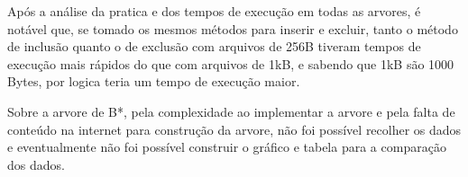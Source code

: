 \label{Conclusão}


Após a análise  da pratica e dos tempos de execução em todas as arvores, é notável que, se tomado os mesmos métodos para inserir e excluir, tanto o método de inclusão quanto o de exclusão com arquivos de 256B tiveram tempos de execução mais rápidos do que com arquivos de 1kB, e sabendo que 1kB são 1000 Bytes, por logica teria um tempo de execução maior.

Sobre a arvore de B*, pela complexidade ao implementar a arvore e pela falta de conteúdo na internet para construção da arvore, não foi possível recolher os dados e eventualmente não foi possível construir o gráfico e tabela para a comparação dos dados.



